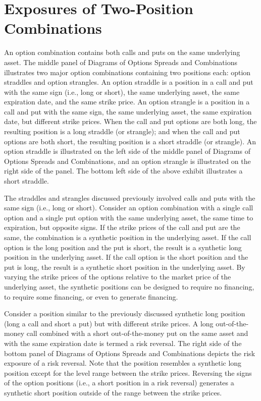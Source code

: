 \documentclass[11pt]{article}
\begin{document}
\section*{Exposures of Two-Position Combinations}
An option combination contains both calls and puts on the same underlying asset. The middle panel of Diagrams of Options Spreads and Combinations illustrates two major option combinations containing two positions each: option straddles and option strangles. An option straddle is a position in a call and put with the same sign (i.e., long or short), the same underlying asset, the same expiration date, and the same strike price. An option strangle is a position in a call and put with the same sign, the same underlying asset, the same expiration date, but different strike prices. When the call and put options are both long, the resulting position is a long straddle (or strangle); and when the call and put options are both short, the resulting position is a short straddle (or strangle). An option straddle is illustrated on the left side of the middle panel of Diagrams of Options Spreads and Combinations, and an option strangle is illustrated on the right side of the panel. The bottom left side of the above exhibit illustrates a short straddle.

The straddles and strangles discussed previously involved calls and puts with the same sign (i.e., long or short). Consider an option combination with a single call option and a single put option with the same underlying asset, the same time to expiration, but opposite signs. If the strike prices of the call and put are the same, the combination is a synthetic position in the underlying asset. If the call option is the long position and the put is short, the result is a synthetic long position in the underlying asset. If the call option is the short position and the put is long, the result is a synthetic short position in the underlying asset. By varying the strike prices of the options relative to the market price of the underlying asset, the synthetic positions can be designed to require no financing, to require some financing, or even to generate financing.

Consider a position similar to the previously discussed synthetic long position (long a call and short a put) but with different strike prices. A long out-of-the-money call combined with a short out-of-the-money put on the same asset and with the same expiration date is termed a risk reversal. The right side of the bottom panel of Diagrams of Options Spreads and Combinations depicts the risk exposure of a risk reversal. Note that the position resembles a synthetic long position except for the level range between the strike prices. Reversing the signs of the option positions (i.e., a short position in a risk reversal) generates a synthetic short position outside of the range between the strike prices.
\end{document}

